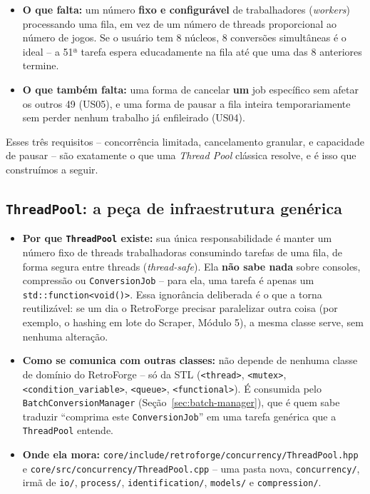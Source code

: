 \begin{itemize}
    \item \textbf{O que falta:} um número \textbf{fixo e configurável} de trabalhadores (\textit{workers}) processando uma fila, em vez de um número de threads proporcional ao número de jogos. Se o usuário tem 8 núcleos, 8 conversões simultâneas é o ideal -- a 51ª tarefa espera educadamente na fila até que uma das 8 anteriores termine.
    \item \textbf{O que também falta:} uma forma de cancelar \textbf{um} job específico sem afetar os outros 49 (US05), e uma forma de pausar a fila inteira temporariamente sem perder nenhum trabalho já enfileirado (US04).
\end{itemize}

Esses três requisitos -- concorrência limitada, cancelamento granular, e capacidade de pausar -- são exatamente o que uma \textit{Thread Pool} clássica resolve, e é isso que construímos a seguir.

\subsection{\texttt{ThreadPool}: a peça de infraestrutura genérica}

\begin{itemize}
    \item \textbf{Por que \texttt{ThreadPool} existe:} sua única responsabilidade é manter um número fixo de threads trabalhadoras consumindo tarefas de uma fila, de forma segura entre threads (\textit{thread-safe}). Ela \textbf{não sabe nada} sobre consoles, compressão ou \texttt{ConversionJob} -- para ela, uma tarefa é apenas um \texttt{std::function<void()>}. Essa ignorância deliberada é o que a torna reutilizável: se um dia o RetroForge precisar paralelizar outra coisa (por exemplo, o hashing em lote do Scraper, Módulo 5), a mesma classe serve, sem nenhuma alteração.
    \item \textbf{Como se comunica com outras classes:} não depende de nenhuma classe de domínio do RetroForge -- só da STL (\texttt{<thread>}, \texttt{<mutex>}, \texttt{<condition\_variable>}, \texttt{<queue>}, \texttt{<functional>}). É consumida pelo \texttt{BatchConversionManager} (Seção~\ref{sec:batch-manager}), que é quem sabe traduzir ``comprima este \texttt{ConversionJob}'' em uma tarefa genérica que a \texttt{ThreadPool} entende.
    \item \textbf{Onde ela mora:} \texttt{core/include/retroforge/concurrency/ThreadPool.hpp} e \texttt{core/src/concurrency/ThreadPool.cpp} -- uma pasta nova, \texttt{concurrency/}, irmã de \texttt{io/}, \texttt{process/}, \texttt{identification/}, \texttt{models/} e \texttt{compression/}.
\end{itemize}

